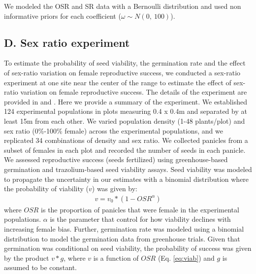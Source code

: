 \documentclass[9pt,twoside,lineno]{pnas-new}
\begin{document}
We modeled the OSR and SR data with a Bernoulli distribution and used non informative priors for each coefficient ($\omega \sim N(0,\ 100)$). 

\subsection*{D. Sex ratio experiment} 
To estimate the probability of seed viability,  the germination rate and the effect of sex-ratio variation on female reproductive success, we conducted a sex-ratio experiment at one site near the center of the range to estimate the effect of sex-ratio variation on female reproductive success.
The details of the experiment are provided in \cite{compagnoni2017can} and \cite{miller2022two}.
Here we provide a summary of the experiment.
We established 124 experimental populations in plots measuring 0.4 x 0.4m and separated by at least 15m from each other.
We varied population density (1-48 plants/plot) and sex ratio (0\%-100\% female) across the experimental populations, and we replicated 34 combinations of density and sex ratio.
We collected panicles from a subset of females in each plot and recorded the number of seeds in each panicle.
We assessed reproductive success (seeds fertilized) using greenhouse-based germination and trazolium-based seed viability assays.
Seed viability was modeled {\color{red}to propagate the uncertainty in our estimates}  with a binomial distribution where the probability of viability ($v$) was given by:
\begin{align}\label{eq:viab}
	v = v_{0} * (1 - OSR^{\alpha})
\end{align}
\noindent where $OSR$ is the proportion of panicles that were female in the experimental populations.
$\alpha$ is the parameter that control for how viability declines with increasing female bias.
Further, germination rate was modeled using a binomial distribution to model the germination data from greenhouse trials.
Given that germination was conditional on seed viability, the probability of success was given by the product $v*g$, where $v$ is a function of $OSR$ (Eq. \ref{eq:viab}) and $g$ is assumed to be constant.

\clearpage
\end{document}
